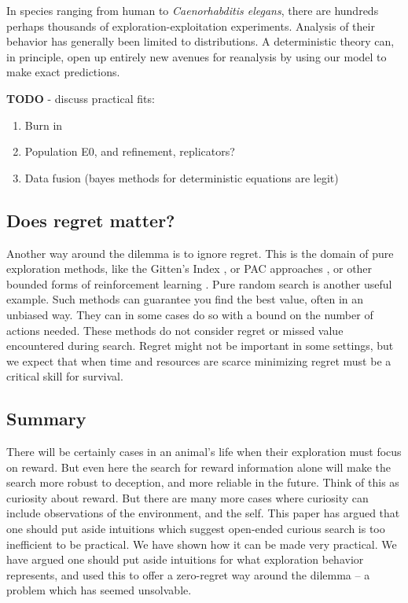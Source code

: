In species ranging from human to \textit{Caenorhabditis elegans}, there are hundreds perhaps thousands of exploration-exploitation experiments. Analysis of their behavior has generally been limited to distributions. A deterministic theory can, in principle, open up entirely new avenues for reanalysis by using our model to make exact predictions.

\textbf{TODO} - discuss practical fits:
\begin{enumerate}
    \item Burn in
    \item Population E0, and refinement, replicators?
    \item Data fusion (bayes methods for deterministic equations are legit)
\end{enumerate}


\subsection*{Does regret matter?}
Another way around the dilemma is to ignore regret. This is the domain of pure exploration methods, like the Gitten’s Index \cite{needed}, or PAC approaches \cite{Valiant1984}, or other bounded forms of reinforcement learning \cite{needed}. Pure random search is another useful example. Such methods can guarantee you find the best value, often in an unbiased way. They can in some cases do so with a bound on the number of actions needed. These methods do not consider regret or missed value encountered during search. Regret might not be important in some settings, but we expect that when time and resources are scarce minimizing regret must be a critical skill for survival.


\subsection*{Summary}
There will be certainly cases in an animal's life when their exploration must focus on reward. But even here the search for reward information alone will make the search more robust to deception, and more reliable in the future. Think of this as curiosity about reward. But there are many more cases where curiosity can include observations of the environment, and the self. This paper has argued that one should put aside intuitions which suggest open-ended curious search is too inefficient to be practical. We have shown how it can be made very practical. We have argued one should put aside intuitions for what exploration behavior represents, and used this to offer a zero-regret way around the dilemma -- a problem which has seemed unsolvable.



